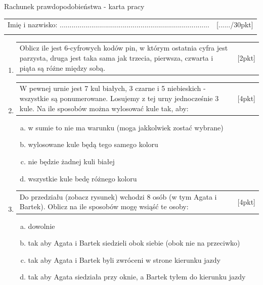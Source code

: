 \documentclass[12pt,a4paper]{article}
\begin{document}
	\begin{center}
		\LARGE Rachunek prawdopodobieństwa - karta pracy
	\end{center}
	\vspace{1.5cm}
	\begin{tabular}{p{13cm} r}
		Imię i nazwisko: ............................................................................
		&[....../30pkt]\\ 
		\vspace{0.5cm}
	\end{tabular}
	\begin{enumerate}[1.]
		\item  \begin{tabular}{p{13cm} r}
			Oblicz ile jest 6-cyfrowych kodów pin, w którym ostatnia cyfra jest parzysta, druga jest taka sama jak trzecia, pierwsza, czwarta i piąta są różne między sobą. &[2pkt]\\ 
		\end{tabular}
		
		\item  \begin{tabular}{p{13cm} r}
			W pewnej urnie jest 7 kul białych, 3 czarne i 5 niebieskich - wszystkie są ponumerowane. Losujemy z tej urny jednocześnie 3 kule. Na ile sposobów można wylosować kule tak, aby:  &[4pkt]\\ 
		\end{tabular}
		
		\begin{enumerate}[a)]
			\item w sumie to nie ma warunku (moga jakkolwiek zostać wybrane)
			\item wylosowane kule będą tego samego koloru
			\item nie będzie żadnej kuli białej
			\item wszystkie kule bedę różnego koloru
		\end{enumerate}
		
		\item  \begin{tabular}{p{13cm} r}
			Do przedziału (zobacz rysunek) wchodzi 8 osób (w tym Agata i Bartek). Oblicz na ile sposobów mogę wsiąść te osoby: &[4pkt]\\ 
		\end{tabular}
	
	\begin{enumerate}[a)]
		\item dowolnie
		\item tak aby Agata i Bartek siedzieli obok siebie (obok nie na przeciwko)
		\item tak aby Agata i Bartek byli zwróceni w strone kierunku jazdy
		\item tak aby Agata siedziała przy oknie, a Bartek tyłem do kierunku jazdy
	\end{enumerate}


\end{enumerate}
\end{document}
